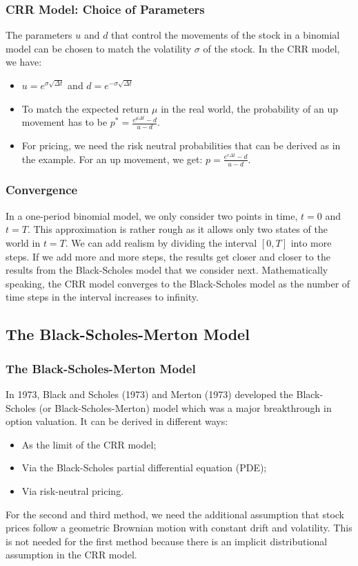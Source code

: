 \begin{frame}[fragile]
\frametitle{CRR Model: Choice of Parameters}
The parameters $u$ and $d$ that control the movements of the stock in a binomial
model can be chosen to match the volatility $\sigma$ of the stock. In the CRR
model, we have:
\begin{itemize}
  \item $u=e^{\sigma\sqrt{\Delta t}}$ and $d=e^{-\sigma\sqrt{\Delta t}}$
  \item To match the expected return $\mu$ in the real world, the probability of
  an up movement has to be $p^*=\frac{e^{\mu \Delta t} -d}{u-d}$.
  \item For pricing, we need the risk neutral probabilities that can be derived
  as in the example. For an up movement, we get: $p=\frac{e^{r \Delta t}
  -d}{u-d}$.
\end{itemize}
\end{frame}


\begin{frame}[fragile]
\frametitle{Convergence}
In a one-period binomial model, we only consider two points in time, $t=0$ and
$t=T$. This approximation is rather rough as it allows only two states of the
world in $t=T$. We can add realism by dividing the interval $[0,T]$ into more
steps. If we add more and more steps, the results get closer and closer to the
results from the Black-Scholes model that we consider next. Mathematically
speaking, the CRR model converges to the Black-Scholes model as the number of
time steps in the interval increases to infinity.
\end{frame}

\subsection{The Black-Scholes-Merton Model}
\begin{frame}[fragile]
\frametitle{The Black-Scholes-Merton Model}
In 1973, Black and Scholes (1973) and Merton (1973)
developed the Black-Scholes (or Black-Scholes-Merton) model which was a major breakthrough in
option valuation. It can be derived in different ways:
\begin{itemize}
  \item As the limit of the CRR model;
  \item Via the Black-Scholes partial differential equation (PDE);
  \item Via risk-neutral pricing.
\end{itemize}
For the second and third method, we need the additional assumption that stock
prices follow a geometric Brownian motion with constant drift and volatility.
This is not needed for the first method because there is an implicit distributional assumption in the CRR model.
\end{frame}

